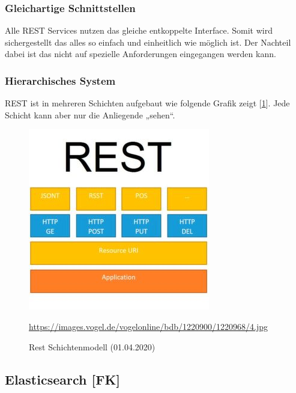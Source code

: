 \subsubsection{Gleichartige Schnittstellen}
Alle REST Services nutzen das gleiche entkoppelte Interface. Somit wird sichergestellt das alles so einfach und einheitlich wie möglich ist. Der Nachteil dabei ist das nicht auf spezielle Anforderungen eingegangen werden kann.
\subsubsection{Hierarchisches System}
REST ist in mehreren Schichten aufgebaut wie folgende Grafik zeigt [\ref{img:Rest_Schichtenmodell}]. Jede Schicht kann aber nur die Anliegende „sehen“. 
\begin{figure}[H]
    \centering
    \includegraphics[scale=1]{images/REST_schichtenmodell.jpg}
    \caption{Rest Schichtenmodell (01.04.2020)}
    \url{https://images.vogel.de/vogelonline/bdb/1220900/1220968/4.jpg}
    \label{img:Rest_Schichtenmodell}
\end{figure}

\subsection{Elasticsearch [FK]}\label{sec:ES}

